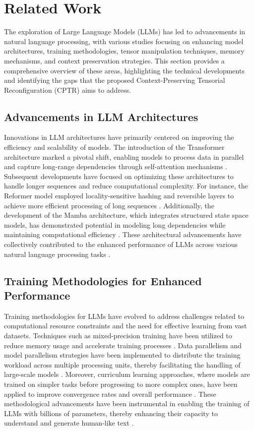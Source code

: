 \section{Related Work}
The exploration of Large Language Models (LLMs) has led to advancements in natural language processing, with various studies focusing on enhancing model architectures, training methodologies, tensor manipulation techniques, memory mechanisms, and context preservation strategies. This section provides a comprehensive overview of these areas, highlighting the technical developments and identifying the gaps that the proposed Context-Preserving Tensorial Reconfiguration (CPTR) aims to address.

\subsection{Advancements in LLM Architectures}

Innovations in LLM architectures have primarily centered on improving the efficiency and scalability of models. The introduction of the Transformer architecture marked a pivotal shift, enabling models to process data in parallel and capture long-range dependencies through self-attention mechanisms \cite{tremblay2024unveiling}. Subsequent developments have focused on optimizing these architectures to handle longer sequences and reduce computational complexity. For instance, the Reformer model employed locality-sensitive hashing and reversible layers to achieve more efficient processing of long sequences \cite{lund2024privacy}. Additionally, the development of the Mamba architecture, which integrates structured state space models, has demonstrated potential in modeling long dependencies while maintaining computational efficiency \cite{bernar2024exploring}. These architectural advancements have collectively contributed to the enhanced performance of LLMs across various natural language processing tasks \cite{hanamaki2024assessing}.

\subsection{Training Methodologies for Enhanced Performance}

Training methodologies for LLMs have evolved to address challenges related to computational resource constraints and the need for effective learning from vast datasets. Techniques such as mixed-precision training have been utilized to reduce memory usage and accelerate training processes \cite{trissnow2024adaptive}. Data parallelism and model parallelism strategies have been implemented to distribute the training workload across multiple processing units, thereby facilitating the handling of large-scale models \cite{blackwood2024implementation}. Moreover, curriculum learning approaches, where models are trained on simpler tasks before progressing to more complex ones, have been applied to improve convergence rates and overall performance \cite{lapov2024dynamic}. These methodological advancements have been instrumental in enabling the training of LLMs with billions of parameters, thereby enhancing their capacity to understand and generate human-like text \cite{lu2024benchmarking}.

